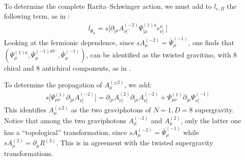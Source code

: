 \documentclass[a4paper,12pt]{article}
\def\L{l}
\let\pa=\partial
\begin{document}
To determine the complete Rarita--Schwinger action, we must
add to $\L_{e,B}$ the following term, as in \cite{BT2}: 
\begin{eqnarray}
\L_{\bar  \Psi_\mu}=
s \Big[  \partial_{[\mu}A^{(-2)}_{\nu]^-} \Psi^{(1)a}_{[\mu}
e^a_{\nu]}\ \Big]
\end{eqnarray}
 Looking at the fermionic dependence, since $sA^{(-2)}_\mu=
\bar \Psi^{(-1)}_\mu$,  
one finds
that $ (\Psi^{(1)a}_\mu, \bar \Psi^{(-1) ab^-}_\mu, \bar
\Psi^{(-1)}_\mu)$,  can be identified as the twisted gravitino, with 8
chiral and 8 antichiral components, as in \cite{BT2}.

To determine  the propagation of $A^{(\pm 2)}_\mu$, we add:
\begin{eqnarray}
s\Big[\Psi^{(1)}_{\mu\nu} \pa_{[\mu} A^{(-2)}_{\nu]}  \Big]
=\pa_{[\mu} A^{(2)}_{\nu]}\pa_{[\mu} A^{(-2)}_{\nu]}
+\Psi^{(1)}_{\mu\nu}\pa_{[\mu}  \Psi^{(-1)}_{\nu]}
\end{eqnarray}
This identifies  $A^{(\pm 2)}_\mu$ as the two graviphotons of 
$N=1,D=8$ supergravity. Notice that among the two graviphotons
$A_\mu ^{(-2)}$ and 
$A_\mu ^{(2)}$, only the latter one has
a ``topological'' transformation, since
$sA_\mu^{(-2)}=\bar \Psi^{(-1)}_\mu$ while $sA_\mu^{(2)}=\partial _\mu
R^{(3)}$. This is in agreement with the twisted supergravity
transformations.
\end{document}
